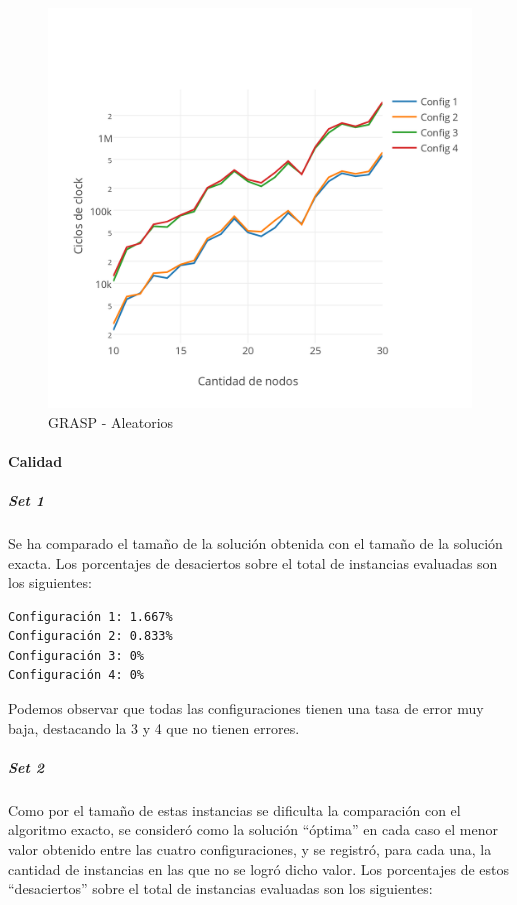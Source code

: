 \begin{figure}[htb]
	\begin{center}
    		\includegraphics[scale=0.8]{imagenes/grasp-aleatorios-tiempo.png}
	\end{center}
	\caption{GRASP - Aleatorios}\label{fig:4D}
\end{figure}

\paragraph{Calidad} 

\subparagraph{Set 1} Se ha comparado el tamaño de la solución obtenida con el tamaño de la solución exacta.  Los porcentajes de desaciertos sobre el total de instancias evaluadas son los siguientes:

\begin{verbatim}
Configuración 1: 1.667%
Configuración 2: 0.833%
Configuración 3: 0%
Configuración 4: 0%
\end{verbatim}

Podemos observar que todas las configuraciones tienen una tasa de error muy baja, destacando la 3 y 4 que no tienen errores.

\subparagraph{Set 2} Como por el tamaño de estas instancias se dificulta la comparación con el algoritmo exacto, se consideró como la solución ``óptima'' en cada caso el menor valor obtenido entre las cuatro configuraciones, y se registró, para cada una, la cantidad de instancias en las que no se logró dicho valor. Los porcentajes de estos ``desaciertos'' sobre el total de instancias evaluadas son los siguientes:

